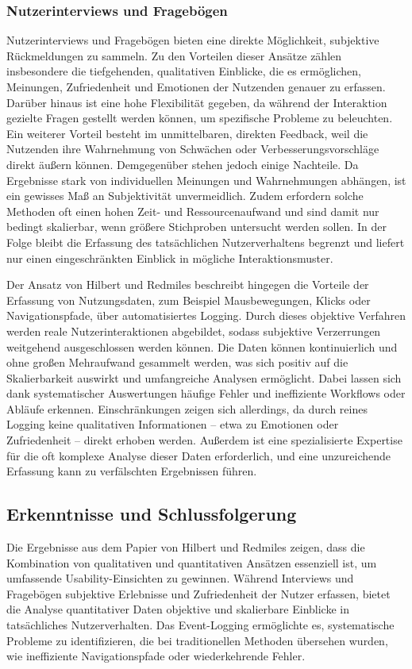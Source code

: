 \documentclass[12pt,oneside]{article}
\begin{document}
\subsubsection{Nutzerinterviews und Fragebögen}
Nutzerinterviews und Fragebögen bieten eine direkte Möglichkeit, subjektive Rückmeldungen zu sammeln. Zu den Vorteilen dieser Ansätze zählen insbesondere die tiefgehenden, qualitativen Einblicke, die es ermöglichen, Meinungen, Zufriedenheit und Emotionen der Nutzenden genauer zu erfassen. Darüber hinaus ist eine hohe Flexibilität gegeben, da während der Interaktion gezielte Fragen gestellt werden können, um spezifische Probleme zu beleuchten. Ein weiterer Vorteil besteht im unmittelbaren, direkten Feedback, weil die Nutzenden ihre Wahrnehmung von Schwächen oder Verbesserungsvorschläge direkt äußern können. Demgegenüber stehen jedoch einige Nachteile. Da Ergebnisse stark von individuellen Meinungen und Wahrnehmungen abhängen, ist ein gewisses Maß an Subjektivität unvermeidlich. Zudem erfordern solche Methoden oft einen hohen Zeit- und Ressourcenaufwand und sind damit nur bedingt skalierbar, wenn größere Stichproben untersucht werden sollen. In der Folge bleibt die Erfassung des tatsächlichen Nutzerverhaltens begrenzt und liefert nur einen eingeschränkten Einblick in mögliche Interaktionsmuster.

Der Ansatz von Hilbert und Redmiles \cite{Hilbert2000} beschreibt hingegen die Vorteile der Erfassung von Nutzungsdaten, zum Beispiel Mausbewegungen, Klicks oder Navigationspfade, über automatisiertes Logging. Durch dieses objektive Verfahren werden reale Nutzerinteraktionen abgebildet, sodass subjektive Verzerrungen weitgehend ausgeschlossen werden können. Die Daten können kontinuierlich und ohne großen Mehraufwand gesammelt werden, was sich positiv auf die Skalierbarkeit auswirkt und umfangreiche Analysen ermöglicht. Dabei lassen sich dank systematischer Auswertungen häufige Fehler und ineffiziente Workflows oder Abläufe erkennen. Einschränkungen zeigen sich allerdings, da durch reines Logging keine qualitativen Informationen – etwa zu Emotionen oder Zufriedenheit – direkt erhoben werden. Außerdem ist eine spezialisierte Expertise für die oft komplexe Analyse dieser Daten erforderlich, und eine unzureichende Erfassung kann zu verfälschten Ergebnissen führen.

\subsection{Erkenntnisse und Schlussfolgerung}
Die Ergebnisse aus dem Papier von Hilbert und Redmiles \cite{Hilbert2000} zeigen, dass die Kombination von qualitativen und quantitativen Ansätzen essenziell ist, um umfassende Usability-Einsichten zu gewinnen. Während Interviews und Fragebögen subjektive Erlebnisse und Zufriedenheit der Nutzer erfassen, bietet die Analyse quantitativer Daten objektive und skalierbare Einblicke in tatsächliches Nutzerverhalten. Das Event-Logging ermöglichte es, systematische Probleme zu identifizieren, die bei traditionellen Methoden übersehen wurden, wie ineffiziente Navigationspfade oder wiederkehrende Fehler.
\end{document}
